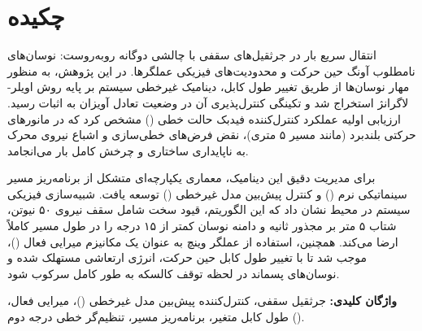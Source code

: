 
\cleardoublepage
{}

\cleardoublepage
\thispagestyle{empty}
\section*{چکیده}

انتقال سریع بار در جرثقیل‌های سقفی با چالشی دوگانه روبه‌روست: نوسان‌های نامطلوب آونگ حین حرکت و محدودیت‌های فیزیکی عملگرها. در این پژوهش، به منظور مهار نوسان‌ها از طریق تغییر طول کابل، دینامیک غیرخطی سیستم بر پایه روش اویلر-لاگرانژ استخراج شد و تکینگی کنترل‌پذیری آن در وضعیت تعادل آویزان به اثبات رسید. ارزیابی اولیه عملکرد کنترل‌کننده فیدبک حالت خطی () مشخص کرد که در مانورهای حرکتی بلندبرد (مانند مسیر ۵ متری)، نقض فرض‌های خطی‌سازی و اشباع نیروی محرک به ناپایداری ساختاری و چرخش کامل بار می‌انجامد.

برای مدیریت دقیق این دینامیک، معماری یکپارچه‌ای متشکل از برنامه‌ریز مسیر سینماتیکی نرم () و کنترل پیش‌بین مدل غیرخطی () توسعه یافت. شبیه‌سازی فیزیکی سیستم در محیط  نشان داد که این الگوریتم، قیود سخت شامل سقف نیروی ۵۰ نیوتن، شتاب ۵ متر بر مجذور ثانیه و دامنه نوسان کمتر از ۱۵ درجه را در طول مسیر کاملاً ارضا می‌کند. همچنین، استفاده از عملگر وینچ به عنوان یک مکانیزم میرایی فعال ()، موجب شد تا با تغییر طول کابل حین حرکت، انرژی ارتعاشی مستهلک شده و نوسان‌های پسماند در لحظه توقف کالسکه به طور کامل سرکوب شود.

\vspace{1cm}
\noindent\textbf{واژگان کلیدی:} جرثقیل سقفی، کنترل‌کننده پیش‌بین مدل غیرخطی ()، میرایی فعال، طول کابل متغیر، برنامه‌ریز مسیر، تنظیم‌گر خطی درجه دوم ().

\cleardoublepage
\tableofcontents


\cleardoublepage
\listoffigures

